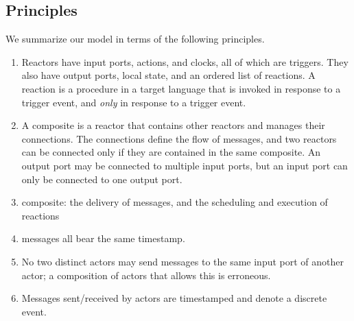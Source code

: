 \documentclass[sigconf]{acmart}
\begin{document}
\subsection{Principles}

We summarize our model in terms of the following principles.

\begin{enumerate}
	\item Reactors have input ports, actions, and clocks, all of which are triggers. They also have output ports, local state, and an ordered list of reactions. A reaction is a procedure in a target language that is invoked in response to a trigger event, and \emph{only} in response to a trigger event.
	\item A composite is a reactor that contains other reactors and manages their connections.
	The connections define the flow of messages,
	and two reactors can be connected only if they are contained in the same composite.
	An output port may be connected to multiple input ports, but an input port can only be connected to one output port.
	
	\item composite: the delivery of messages, and the scheduling and execution of reactions
	\item messages all bear the same timestamp.
	\item No two distinct actors may send messages to the same input port of another actor;
	a composition of actors that allows this is erroneous.
	\item Messages sent/received by actors are timestamped and denote a discrete event.
\end{enumerate}
\end{document}
